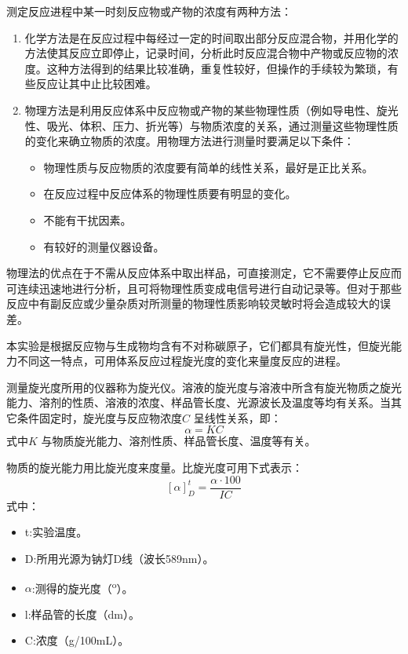 \documentclass[11pt]{report}
\begin{document}
测定反应进程中某一时刻反应物或产物的浓度有两种方法：
\begin{enumerate}
\item 化学方法是在反应过程中每经过一定的时间取出部分反应混合物，并用化学的方法使其反应立即停止，记录时间，分析此时反应混合物中产物或反应物的浓度。这种方法得到的结果比较准确，重复性较好，但操作的手续较为繁琐，有些反应让其中止比较困难。
\item 物理方法是利用反应体系中反应物或产物的某些物理性质（例如导电性、旋光性、吸光、体积、压力、折光等）与物质浓度的关系，通过测量这些物理性质的变化来确立物质的浓度。用物理方法进行测量时要满足以下条件：
\begin{itemize}
\item 物理性质与反应物质的浓度要有简单的线性关系，最好是正比关系。
\item 在反应过程中反应体系的物理性质要有明显的变化。
\item 不能有干扰因素。
\item 有较好的测量仪器设备。
\end{itemize}
\end{enumerate}

物理法的优点在于不需从反应体系中取出样品，可直接测定，它不需要停止反应而可连续迅速地进行分析，且可将物理性质变成电信号进行自动记录等。但对于那些反应中有副反应或少量杂质对所测量的物理性质影响较灵敏时将会造成较大的误差。

本实验是根据反应物与生成物均含有不对称碳原子，它们都具有旋光性，但旋光能力不同这一特点，可用体系反应过程旋光度的变化来量度反应的进程。

测量旋光度所用的仪器称为旋光仪。溶液的旋光度与溶液中所含有旋光物质之旋光能力、溶剂的性质、溶液的浓度、样品管长度、光源波长及温度等均有关系。当其它条件固定时，旋光度与反应物浓度\(C\) 呈线性关系，即：
\[
\alpha = KC
\]
式中\(K\) 与物质旋光能力、溶剂性质、样品管长度、温度等有关。

物质的旋光能力用比旋光度来度量。比旋光度可用下式表示：
\[
[\alpha]_{D}^{t}=\frac{\alpha\cdot 100}{IC}
\]
式中：
\begin{itemize}
\item t:实验温度。
\item D:所用光源为钠灯D线（波长589nm）。
\item \(\alpha\):测得的旋光度（\textsuperscript{o}）。
\item l:样品管的长度（dm）。
\item C:浓度（g/100mL）。
\end{itemize}
\end{document}
